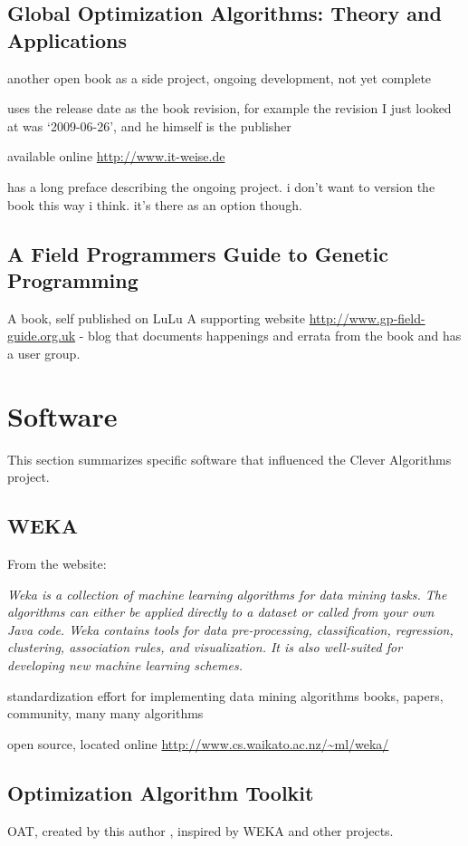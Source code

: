 \documentclass[a4paper, 11pt]{article}
\begin{document}
\subsection{Global Optimization Algorithms: Theory and Applications}
another open book as a side project, ongoing development, not yet complete \cite{Weise2007}

uses the release date as the book revision, for example the revision I just looked at was `2009-06-26', and he himself is the publisher

available online \url{http://www.it-weise.de}

has a long preface describing the ongoing project. i don't want to version the book this way i think. it's there as an option though.


\subsection{A Field Programmers Guide to Genetic Programming}
A book, self published on LuLu \cite{Poli2008}
A supporting website \url{http://www.gp-field-guide.org.uk} - blog that documents happenings and errata from the book and has a user group.



\section{Software}
\label{sec:software}
This section summarizes specific software that influenced the Clever Algorithms project.

\subsection{WEKA}
From the website: 

\emph{Weka is a collection of machine learning algorithms for data mining tasks. The algorithms can either be applied directly to a dataset or called from your own Java code. Weka contains tools for data pre-processing, classification, regression, clustering, association rules, and visualization. It is also well-suited for developing new machine learning schemes.}



standardization effort for implementing data mining algorithms \cite{Hall2009}
books, papers, community, many many algorithms

open source, located online \url{http://www.cs.waikato.ac.nz/~ml/weka/}

\subsection{Optimization Algorithm Toolkit}
OAT, created by this author \cite{Brownlee2007}, inspired by WEKA and other projects.
\end{document}
